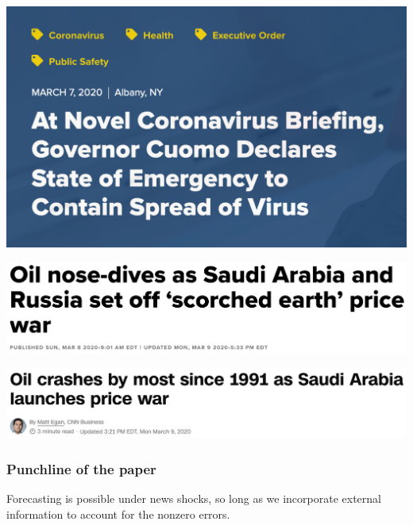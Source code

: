 \documentclass{beamer}
\theoremstyle{definition}
\begin{document}
\begin{frame}

    \begin{example}
        \href{https://www.governor.ny.gov/news/novel-coronavirus-briefing-governor-cuomo-declares-state-emergency-contain-spread-virus}{\includegraphics[scale=.3]{NYS_state.png}}

        \href{https://www.cnbc.com/2020/03/08/opec-deal-collapse-sparks-price-war-20-oil-in-2020-is-coming.html}{\includegraphics[scale=.3]{cnn.png}}

        \href{https://www.cnn.com/2020/03/08/investing/oil-prices-crash-opec-russia-saudi-arabia/index.html}{\includegraphics[scale=.3]{cnbc.png}}
        \end{example}


 
\end{frame}

\begin{frame}
\frametitle{Punchline of the paper}

Forecasting is possible under news shocks, so long as we incorporate external information to account for the nonzero errors.

\end{frame}
\end{document}
